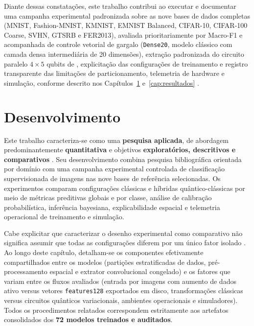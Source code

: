 \documentclass[
    12pt,
    openright,
    oneside,
    a4paper,
    english,
    brazil
]{abntex2}
\begin{document}
Diante dessas constatações, este trabalho contribui ao executar e documentar uma campanha experimental padronizada sobre as nove bases de dados completas (MNIST, Fashion-MNIST, KMNIST, EMNIST Balanced, CIFAR-10, CIFAR-100 Coarse, SVHN, GTSRB e FER2013), avaliada prioritariamente por Macro-F1 e acompanhada de controle vetorial de gargalo (\texttt{Dense20}, modelo clássico com camada densa intermediária de 20 dimensões), extração padronizada do circuito paralelo \(4 \times 5\) qubits de , explicitação das configurações de treinamento e registro transparente das limitações de particionamento, telemetria de hardware e simulação, conforme descrito nos Capítulos~\ref{cap:desenvolvimento} e~\ref{cap:resultados} \cite{Wazlawick2020,senokosov2024qml}.


\chapter{Desenvolvimento}
\label{cap:desenvolvimento}

Este trabalho caracteriza-se como uma \textbf{pesquisa aplicada}, de abordagem predominantemente \textbf{quantitativa} e objetivos \textbf{exploratórios, descritivos e comparativos} \cite{Wazlawick2020}. Seu desenvolvimento combina pesquisa bibliográfica orientada por domínio com uma campanha experimental controlada de classificação supervisionada de imagens nas nove bases de referência selecionadas. Os experimentos comparam configurações clássicas e híbridas quântico-clássicas por meio de métricas preditivas globais e por classe, análise de calibração probabilística, inferência bayesiana, explicabilidade espacial e telemetria operacional de treinamento e simulação.

Cabe explicitar que caracterizar o desenho experimental como comparativo não significa assumir que todas as configurações diferem por um único fator isolado \cite{Wazlawick2020}. Ao longo deste capítulo, detalham-se os componentes efetivamente compartilhados entre os modelos (partições estratificadas de dados, pré-processamento espacial e extrator convolucional congelado) e os fatores que variam entre os fluxos avaliados (entrada por imagens com aumento de dados ativo versus vetores \texttt{features128} exportados em disco, transformações clássicas versus circuitos quânticos variacionais, ambientes operacionais e simuladores). Todos os procedimentos relatados correspondem estritamente aos artefatos consolidados dos \textbf{72 modelos treinados e auditados}.
\end{document}

